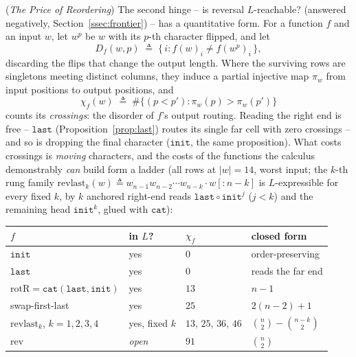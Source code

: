 \documentclass[runningheads,envcountsect]{llncs}
\renewenvironment{remark}
  {\rmfamily\trivlist\item[\hskip\labelsep{\itshape Remark.}]\ignorespaces}
  {\endtrivlist}
\begin{document}
\begin{remark}
    (\emph{The Price of Reordering})
    \label{rem:price}
    The second hinge -- is reversal $L$-reachable? (answered negatively, Section~\ref{ssec:frontier}) -- has a quantitative form. For a function $f$ and an input $w$, let $w^{p}$ be $w$ with its $p$-th character flipped, and let
    \[
        D_f(w,p) \;\triangleq\; \{\, i : f(w)_i \neq f(w^{p})_i \,\},
    \]
    discarding the flips that change the output length. Where the surviving rows are singletons meeting distinct columns, they induce a partial injective map $\pi_w$ from input positions to output positions, and
    \[
        \chi_f(w) \;\triangleq\; \#\{(p < p') : \pi_w(p) > \pi_w(p')\}
    \]
    counts its \emph{crossings}: the disorder of $f$'s output routing. Reading the right end is free -- $\mathtt{last}$ (Proposition~\ref{prop:last}) routes its single far cell with zero crossings -- and so is dropping the final character ($\mathtt{init}$, the same proposition). What costs crossings is \emph{moving} characters, and the costs of the functions the calculus demonstrably \emph{can} build form a ladder (all rows at $|w| = 14$, worst input; the $k$-th rung family $\mathrm{revlast}_k(w) \triangleq w_{n-1} w_{n-2} \cdots w_{n-k} \cdot w[:n{-}k]$ is $L$-expressible for every fixed $k$, by $k$ anchored right-end reads $\mathtt{last} \circ \mathtt{init}^{j}$ ($j < k$) and the remaining head $\mathtt{init}^{k}$, glued with $\mathtt{cat}$):

    \begin{center}
        \small
        \begin{tabular}{llll}
            \hline
            $f$ & in $L$? & $\chi_f$ & closed form \\
            \hline
            $\mathtt{init}$ & yes & $0$ & order-preserving \\
            $\mathtt{last}$ & yes & $0$ & reads the far end \\
            $\mathrm{rotR} = \mathtt{cat}(\mathtt{last},\mathtt{init})$ & yes & $13$ & $n-1$ \\
            swap-first-last & yes & $25$ & $2(n{-}2)+1$ \\
            $\mathrm{revlast}_k$, $k=1,2,3,4$ & yes, fixed $k$ & $13,\,25,\,36,\,46$ & $\binom{n}{2}-\binom{n-k}{2}$ \\
            $\mathrm{rev}$ & \emph{open} & $91$ & $\binom{n}{2}$ \\
            \hline
        \end{tabular}
    \end{center}


\end{remark}
\end{document}

